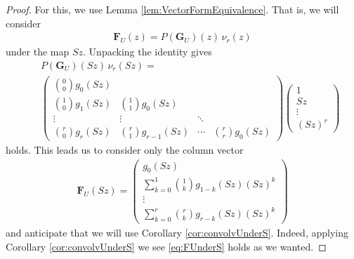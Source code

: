 \documentclass[11pt]{article}
\begin{document}
    \begin{proof}
       For this, we use Lemma \ref{lem:VectorFormEquivalence}. That is, we will consider 
            \begin{eqnarray*}
                \mathbf{F}_U(z) = P(\mathbf{G}_U)(z)\,\nu_r(z) 
            \end{eqnarray*}
        under the map $ Sz $. Unpacking the identity gives
            \begin{eqnarray*}
                &{}& P(\mathbf{G}_U)(Sz)\,\nu_r(Sz) = \\ &{}&
                   \begin{pmatrix}
                        \binom{0}{0}g_0(Sz) \\
                        \binom{1}{0} g_1(Sz) & \binom{1}{1}g_0(Sz) \\
                        \vdots & \vdots & \ddots \\
                        \binom{r}{0}g_r(Sz) & \binom{r}{1}g_{r-1}(Sz) & \cdots & \binom{r}{r}g_{0}(Sz)  
                    \end{pmatrix}
                    \begin{pmatrix}
                        1 \\
                        Sz \\
                        \vdots\\
                        (Sz)^r
                    \end{pmatrix}
            \end{eqnarray*}
        holds. This leads us to consider only the column vector
            \begin{eqnarray*}
                \mathbf{F}_U(Sz) = 
                \begin{pmatrix}
                    g_0(Sz) \\
                    \sum_{k=0}^{1} \binom{1}{k}g_{1-k}(Sz)(Sz)^k \\
                    \vdots \\
                    \sum_{k=0}^{r} \binom{r}{k}g_{r-k}(Sz)(Sz)^k
                \end{pmatrix}
            \end{eqnarray*}
        and anticipate that we will use Corollary \ref{cor:convolvUnderS}. Indeed, applying Corollary \ref{cor:convolvUnderS} we see \eqref{eq:FUnderS} holds as we wanted. 
    \end{proof}



\end{document}
